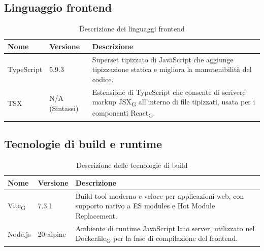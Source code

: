 \documentclass[11pt,a4paper]{article}
\newcommand{\gls}[1]{#1\textsubscript{G}}
\begin{document}
\subsection{Linguaggio frontend}
\begin{table}[H]
    \centering
    \begin{tabular}{|p{}|p{}|p{}|}
        \hline
        \textbf{Nome} & \textbf{Versione} & \textbf{Descrizione} \\
        \hline
        TypeScript & 5.9.3 & Superset tipizzato di JavaScript che aggiunge tipizzazione statica e migliora la manutenibilità del codice. \\
        \hline
        TSX & N/A (Sintassi) & Estensione di TypeScript che consente di scrivere markup \gls{JSX} all'interno di file tipizzati, usata per i componenti \gls{React}. \\
        \hline
    \end{tabular}
    \caption{Descrizione dei linguaggi frontend}
    \label{tab:linguaggi_frontend}
\end{table}

\subsection{Tecnologie di build e runtime}
\begin{table}[H]
    \centering
    \begin{tabular}{|p{}|p{}|p{}|}
        \hline
        \textbf{Nome} & \textbf{Versione} & \textbf{Descrizione} \\
        \hline
        \gls{Vite} & 7.3.1 & Build tool moderno e veloce per applicazioni web, con supporto nativo a ES modules e Hot Module Replacement. \\
        \hline
        Node.js & 20-alpine & Ambiente di runtime JavaScript lato server, utilizzato nel \gls{Dockerfile} per la fase di compilazione del frontend. \\
        \hline
    \end{tabular}
    \caption{Descrizione delle tecnologie di build}
    \label{tab:tecnologie_build}
\end{table}
\end{document}
